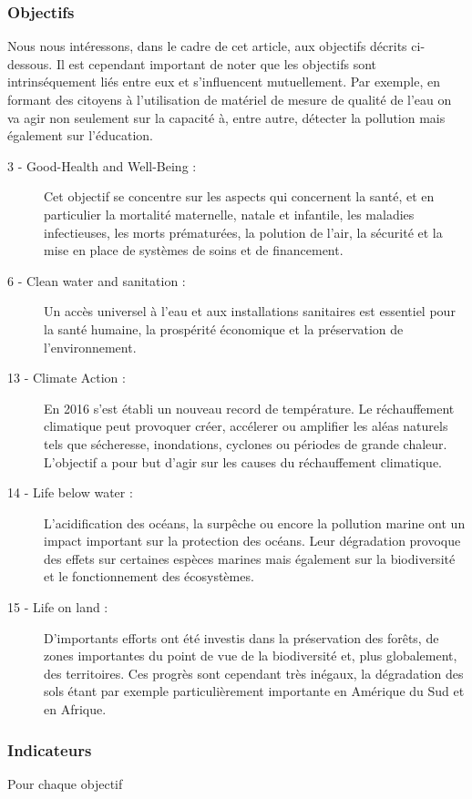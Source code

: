 \documentclass[10pt, conference, compsocconf]{llncs}
\begin{document}
\subsubsection{Objectifs}
Nous nous intéressons, dans le cadre de cet article, aux objectifs décrits ci-dessous. Il est cependant important de noter que les objectifs sont intrinséquement liés entre eux et s'influencent mutuellement. Par exemple, en formant des citoyens à l'utilisation de matériel de mesure de qualité de l'eau on va agir non seulement sur la capacité à, entre autre, détecter la pollution mais également sur l'éducation.
\begin{description}
	\item[ 3 - Good-Health and Well-Being :] Cet objectif se concentre sur les aspects qui	concernent la santé, et en particulier la mortalité maternelle, natale et infantile, les maladies infectieuses, les morts prématurées, la polution de l'air, la sécurité et la mise en place de systèmes de soins et de financement.
	\item[ 6 - Clean water and sanitation :] Un accès universel à l'eau et aux installations sanitaires est essentiel pour la santé humaine, la prospérité économique et la préservation de l'environnement.
	\item[13 - Climate Action :] En 2016 s'est établi un nouveau record de température. Le réchauffement climatique peut provoquer créer, accélerer ou amplifier les aléas	naturels tels que sécheresse, inondations, cyclones ou périodes de grande chaleur. L'objectif a pour but d'agir sur les causes du réchauffement climatique.
	\item[14 - Life below water :] L'acidification des océans, la surpêche ou encore la pollution marine ont un impact important sur la protection des océans. Leur dégradation provoque des effets sur certaines espèces marines mais également sur la biodiversité et le fonctionnement des écosystèmes.
	\item[15 - Life on land :] D'importants efforts ont été investis dans la préservation des forêts, de zones importantes du point de vue de la biodiversité et, plus globalement, des territoires. Ces progrès sont cependant très inégaux, la dégradation des sols étant par exemple particulièrement importante en Amérique du Sud et en Afrique.
\end{description}

\subsubsection{Indicateurs}
Pour chaque objectif
\end{document}
